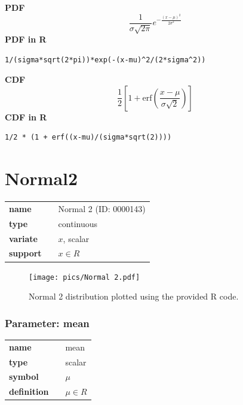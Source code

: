 \documentclass{article}
\begin{document}
\smallskip \noindent \hspace{.2cm} \textbf{PDF} 
\begin{equation*}\frac{1}{\sigma \sqrt{2 \pi}}e^{-\frac{(x-\mu)^2}{2\sigma^2}}\end{equation*}
\smallskip \noindent \hspace{.2cm} \textbf{PDF in R}  
\begin{verbatim}1/(sigma*sqrt(2*pi))*exp(-(x-mu)^2/(2*sigma^2))\end{verbatim}
\smallskip \noindent \hspace{.2cm} \textbf{CDF} 
\begin{equation*}\frac12\left[1 + \text{erf}\left( \frac{x-\mu}{\sigma\sqrt{2}}\right)\right]\end{equation*}
\smallskip \noindent \hspace{.2cm} \textbf{CDF in R} 
\begin{verbatim}1/2 * (1 + erf((x-mu)/(sigma*sqrt(2))))\end{verbatim}
\smallskip\section*{Normal2} 

  \bigskip 

\begin{tabular}{p{2cm}cl}
\textbf{name} & & Normal 2 (ID: 0000143)\\ 
 
\textbf{type} & & continuous \\ 

\textbf{variate} & & $x$, scalar \\ 

\textbf{support} & & $x \in R$
\end{tabular}

\begin{figure}[ht!]
\centering
  \texttt{[image: pics/Normal 2.pdf]}
 \caption{Normal 2 distribution plotted using the provided R code.}
 \label{fig:Normal 2}
\end{figure}

\subsubsection*{Parameter: mean}

\noindent\begin{tabular}{p{2cm}cl}
\textbf{name} & & mean \\
\textbf{type} & & scalar \\
\textbf{symbol} & & $\mu$  \\
\textbf{definition} & & $\mu \in R$
\end{tabular}
\end{document}
